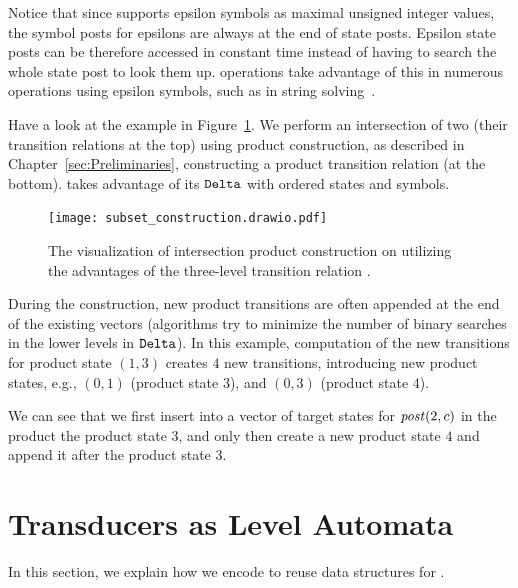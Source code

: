 Notice that since \mata supports epsilon symbols as maximal unsigned integer values, the symbol posts for epsilons are always at the end of state posts.
Epsilon state posts can be therefore accessed in constant time instead of having to search the whole state post to look them up.
\mata operations take advantage of this in numerous operations using epsilon symbols, such as in string solving~\cite{fm23_equations_synergy_regular_constraints_DBLP:conf/fm/BlahoudekCCHHLS23}.

\begin{example}
  Have a look at the example in Figure~\ref{fig:delta_struct_product_construction}.
  We perform an intersection of two \nfas (their transition relations at the top) using product construction, as described in Chapter~\ref{sec:Preliminaries}, constructing a product transition relation (at the bottom).
  \mata takes advantage of its $\mathtt{Delta}$ with ordered states and symbols.

  \begin{figure}
    \centering
  \texttt{[image: subset\_construction.drawio.pdf]}
  \caption{
  The visualization of intersection product construction on \nfas utilizing the advantages of the three-level transition relation \deltastruct.
  }
  \label{fig:delta_struct_product_construction}
  \end{figure}

  During the construction, new product transitions are often appended at the end of the existing vectors (algorithms try to minimize the number of binary searches in the lower levels in $\mathtt{Delta}$).
  In this example, computation of the new transitions for product state $(1, 3)$ creates $4$ new transitions, introducing new product states, e.g., $(0, 1)$ (product state $3$), and $(0, 3)$ (product state $4$).

  We can see that we first insert into a vector of target states for $\mathit{post}(2, c)$ in the product the product state $3$, and only then create a new product state $4$ and append it after the product state $3$.
\end{example}

\section{Transducers as Level Automata}
\label{sec:level_automata}

In this section, we explain how we encode \nfts to reuse data structures for \nfas.

